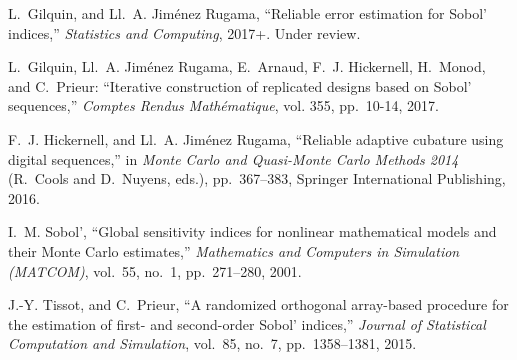 \documentclass[12pt]{article}
\begin{document}
\begin{thebibliography}{1}

L.~Gilquin, and {\relax Ll}.~A. {Jim\'enez Rugama}, ``Reliable error estimation for {S}obol' indices,'' {\em Statistics and Computing}, 2017+. Under review.%

L.~Gilquin, {\relax Ll}.~A. {Jim\'enez Rugama}, E.~Arnaud, F.~J. Hickernell, H.~Monod, and C.~Prieur: ``Iterative construction of replicated designs based on Sobol' sequences,'' {\em Comptes Rendus Math\'ematique}, vol. 355, pp.~10-14, 2017.

F.~J. Hickernell, and {\relax Ll}.~A. {Jim\'enez Rugama}, ``Reliable adaptive cubature using digital sequences,'' in {\em Monte Carlo and Quasi-Monte Carlo Methods 2014} (R.~Cools and D.~Nuyens, eds.), pp.~367--383, Springer International Publishing, 2016.

I.~M. Sobol', ``Global sensitivity indices for nonlinear mathematical models and their {M}onte {C}arlo estimates,'' {\em Mathematics and Computers in Simulation (MATCOM)}, vol.~55, no.~1, pp.~271--280, 2001.
  
J.-Y. Tissot, and C.~Prieur, ``A randomized orthogonal array-based procedure for the estimation of first- and second-order {S}obol' indices,'' {\em Journal of Statistical Computation and Simulation}, vol.~85, no.~7, pp.~1358--1381, 2015.


\end{thebibliography}
\end{document}
